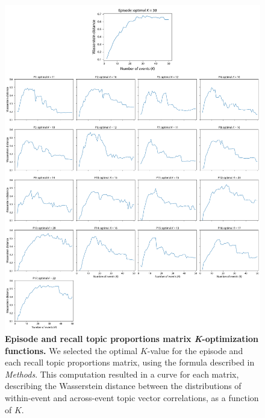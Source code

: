 \documentclass{article}
\begin{document}
\begin{figure}[p!]
\centering
\includegraphics[width=\textwidth]{figs/k_optimization}
\caption{\small \textbf{Episode and recall topic proportions matrix \textit{K}-optimization functions.}  We selected the optimal $K$-value for the episode and each recall topic proportions matrix, using the formula described in \textit{Methods}. This computation resulted in a curve for each matrix, describing the Wasserstein distance between the distributions of within-event and across-event topic vector correlations, as a function of $K$.}
\label{fig:k_optimization}
\end{figure}

\newpage
\renewcommand{\refname}{Supplemental references}

\end{document}

